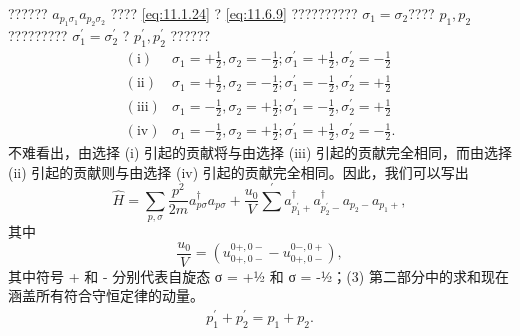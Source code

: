?????? \(a_{p_{1}\sigma_{1}}a_{p_{2}\sigma_{2}}\) ???? \autoref{eq:11.1.24} ? \autoref{eq:11.6.9} ?????????? \(\sigma_{1}=\sigma_{2}\)???? \(p_{1},p_{2}\) ????????? \(\sigma_{1}^{\prime}=\sigma_{2}^{\prime}\) ? \(p_{1}^{\prime},p_{2}^{\prime}\) ??????
\begin{equation}\tag{11.6.10}\label{eq:11.6.10}
\begin{array}{rl} { \mathrm { ( i ) } } & { \sigma _ { 1 } = + \frac { 1 } { 2 } ,  \sigma _ { 2 } = - \frac { 1 } { 2 } ;  \sigma _ { 1 } ^{\prime} = + \frac { 1 } { 2 } ,  \sigma _ { 2 } ^{\prime} = - \frac { 1 } { 2 } } \\{ \mathrm { ( i i ) } } & { \sigma _ { 1 } = + \frac { 1 } { 2 } ,  \sigma _ { 2 } = - \frac { 1 } { 2 } ;  \sigma _ { 1 } ^{\prime} = - \frac { 1 } { 2 } ,  \sigma _ { 2 } ^{\prime} = + \frac { 1 } { 2 } } \\{ \mathrm { ( i i i ) } } & { \sigma _ { 1 } = - \frac { 1 } { 2 } ,  \sigma _ { 2 } = + \frac { 1 } { 2 } ;  \sigma _ { 1 } ^{\prime} = - \frac { 1 } { 2 } ,  \sigma _ { 2 } ^{\prime} = + \frac { 1 } { 2 } } \\{ \mathrm { ( i v ) } } & { \sigma _ { 1 } = - \frac { 1 } { 2 } ,  \sigma _ { 2 } = + \frac { 1 } { 2 } ;  \sigma _ { 1 } ^{\prime} = + \frac { 1 } { 2 } ,  \sigma _ { 2 } ^{\prime} = - \frac { 1 } { 2 } . } \end{array}
\end{equation}
不难看出，由选择 (i) 引起的贡献将与由选择 (iii) 引起的贡献完全相同，而由选择 (ii) 引起的贡献则与由选择 (iv) 引起的贡献完全相同。因此，我们可以写出
\begin{equation}\tag{11.6.11}\label{eq:11.6.11}
\hat { H } = \sum _ { p , \sigma } \frac { p ^{2} } { 2 m } a _ { p \sigma } ^{\dagger} a _ { p \sigma } + \frac { u _ { 0 } } { V } \sum ^{\prime} a _ { p _ { 1 } ^{\prime} + } ^{\dagger} a _ { p _ { 2 } ^{\prime} - } ^{\dagger} a _ { p _ { 2 } - } a _ { p _ { 1 } + } ,
\end{equation}
其中
\begin{equation}\tag{11.6.12}\label{eq:11.6.12}
\frac { u _ { 0 } } { V } = \left( u _ { 0 + , 0 - } ^{0 + , 0 -} - u _ { 0 + , 0 - } ^{0 - , 0 +} \right) ,
\end{equation}
其中符号 + 和 - 分别代表自旋态 σ = +½ 和 σ = -½；(3) 第二部分中的求和现在涵盖所有符合守恒定律的动量。
\begin{equation}\tag{11.6.13}\label{eq:11.6.13}
\begin{array}{r} { p _ { 1 } ^{\prime} + p _ { 2 } ^{\prime} = p _ { 1 } + p _ { 2 } . } \end{array}
\end{equation}
